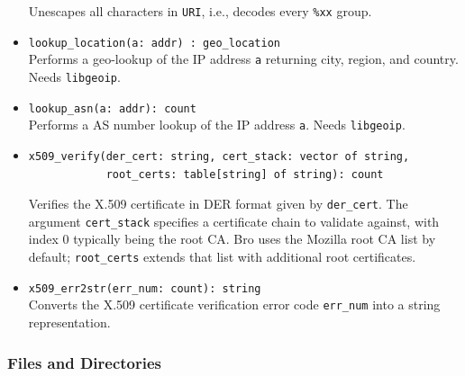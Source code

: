 \documentclass[10pt,landscape]{article}
\begin{document}
\begin{multicols*}{2}
\begin{itemize}
    Unescapes all characters in \texttt{URI}, i.e., decodes every \verb|%xx|
    group.
  \item \verb|lookup_location(a: addr) : geo_location|\\
    Performs a geo-lookup of the IP address \verb|a| returning city, region,
    and country.
    Needs \texttt{libgeoip}.
  \item \verb|lookup_asn(a: addr): count|\\
    Performs a AS number lookup of the IP address \verb|a|. 
    Needs \texttt{libgeoip}.
  \item
\begin{verbatim}
x509_verify(der_cert: string, cert_stack: vector of string,
            root_certs: table[string] of string): count
\end{verbatim}
    Verifies the X.509 certificate in DER format given by \verb|der_cert|. The
    argument \verb|cert_stack| specifies a certificate chain to validate
    against, with index 0 typically being the root CA. Bro uses the Mozilla 
    root CA list by default; \verb|root_certs| extends that list with
    additional root certificates.
  \item \verb|x509_err2str(err_num: count): string|\\
    Converts the X.509 certificate verification error code \verb|err_num| into
    a string representation.
\end{itemize}

\subsubsection*{Files and Directories}


\end{multicols*}
\end{document}
